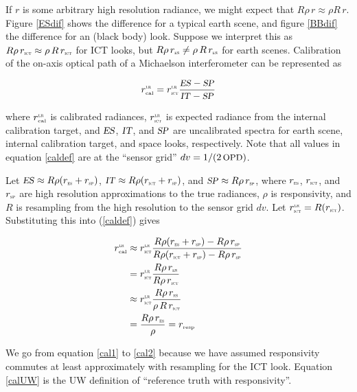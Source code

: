 \documentclass[12pt]{article}
\begin{document}
If $r$ is some arbitrary high resolution radiance, we might expect
that $R\rho\,r \approx \rho R\,r$.  Figure \ref{ESdif} shows the
difference for a typical earth scene, and figure \ref{BBdif} the
difference for an {\ict} (black body) look.  Suppose we interpret
this as $R\rho\,\rIT \approx \rho\,R\,\rIT$ for ICT looks, but
$R\rho\,\rES \ne \rho\,R\,\rES$ for earth scenes.  Calibration of
the on-axis optical path of a Michaelson interferometer can be
represented as

\begin{equation}\label{caldef}
  \rcalLR = \rITLR  \frac{\ES - \SP}{\IT - \SP}
\end{equation} 

\noindent
where $\rcalLR$ is calibrated radiances, $\rITLR$ is expected
radiance from the internal calibration target, and $\ES$, $\IT$, and
$\SP$ are uncalibrated spectra for earth scene, internal calibration
target, and space looks, respectively.  Note that all values in
equation \ref{caldef} are at the ``sensor grid'' $dv = 1/ (2\,
\opd)$.

Let $\ES \approx R\rho(\rES+\rSP)$, $\IT \approx R\rho(\rIT+\rSP)$,
and $\SP \approx R\rho\,\rSP$, where $\rES$, $\rIT$, and $\rSP$ are
high resolution approximations to the true radiances, $\rho$ is
responsivity, and $R$ is resampling from the high resolution to the
sensor grid $dv$.  Let $\rITLR = R(\rIT)$.  Substituting this into
(\ref{caldef}) gives

\begin{align}
  \rcalLR &\approx \rITLR \frac{R\rho(\rES+\rSP) - R\rho\,\rSP}
                               {R\rho(\rIT+\rSP) - R\rho\,\rSP} \notag \\
          &= \rITLR \frac{R\rho\,\rES}
                         {R\rho\,\rIT} \label{cal1} \\
          &\approx \rITLR \frac{R\rho\,\rES}
                               {\rho\,R\,\rIT} \label{cal2} \\
          &= \frac{R\rho\,\rES} 
                  {\rho} = \rresp \label{calUW}
\end{align} 

\noindent
We go from equation \ref{cal1} to \ref{cal2} because we have assumed
responsivity commutes at least approximately with resampling for the
ICT look.   Equation \ref{calUW} is the UW definition of ``reference
truth with responsivity''.
\end{document}
